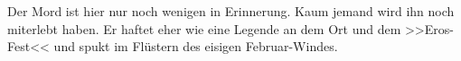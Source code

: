 Der Mord ist hier nur noch wenigen in Erinnerung. Kaum jemand wird ihn noch
miterlebt haben. Er haftet eher wie eine Legende an dem Ort und dem
>>Eros-Fest<<
und spukt im Flüstern des eisigen Februar-Windes.
